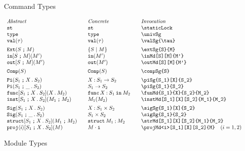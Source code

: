 \documentclass[11pt]{article}
\begin{document}
\begin{figure}
  \caption{Command Types}
  \label{fig:cmd}
\end{figure}

\begin{figure}

  \begin{small}
    \begin{displaymath}
      \begin{array}{l@{\qquad}l@{\qquad}l@{\qquad}l}
        \textit{Abstract} & \textit{Concrete} & \textit{Invocation} \\
        \staticLock                    & \staticLock*         & \verb|\staticLock|                              \\
        \univSg                        & \univSg*             & \verb|\univSg|                                  \\
        \valSg{\tau}                   & \valSg*{\tau}        & \verb|\valSg{\tau}|                             \\[1ex]
        \extSg{S}{M}                   & \extSg*{S}{M}        & \verb|\extSg{S}{M}|                             \\
        \inMd[S][M]{M'}                & \inMd*{M'}           & \verb|\inMd[S][M]{M'}|                          \\
        \outMd[S][M]{M'}               & \outMd*{M'}          & \verb|\outMd[S][M]{M'}|                         \\[1ex]
        \compSg{S}                     & \compSg*{S}          & \verb|\compSg{S}|                               \\[1ex]
        \piSg{S_1}[X]{S_2}             & \piSg*{S_1}[X]{S_2}  & \verb|\piSg{S_1}[X]{S_2}|                       \\
        \piSg{S_1}{S_2}                & \piSg*{S_1}{S_2}     & \verb|\piSg{S_1}{S_2}| \\
        \funMd{S_1}{X}{S_2}{M_2}       & \funMd*{S_1}{X}{S_2}{M_2} & \verb|\funMd{S_1}{X}{S_2}{M_2}|                      \\
        \instMd[S_1][X][S_2]{M_1}{M_2} & \instMd*{M_1}{M_2}   & \verb|\instMd[S_1][X][S_2]{M_1}{M_2}|           \\[1ex]
        \sigSg{S_1}[X]{S_2}            & \sigSg*{S_1}[X]{S_2} & \verb|\sigSg{S_1}[X]{S_2}|                      \\
        \sigSg{S_1}{S_2}               & \sigSg*{S_1}{S_2}    & \verb|\sigSg{S_1}{S_2}| \\
        \strMd[S_1][X][S_2]{M_1}{M_2}  & \strMd*{M_1}{M_2}    & \verb|\strMd[S_1][X][S_2]{M_1}{M_2}|            \\
        \projMd<i>[S_1][X][S_2]{M}     & \projMd*<i>{M}       & \verb|\projMd<i>[S_1][X][S_2]{M}| \quad (i=1,2)
      \end{array}
    \end{displaymath}
  \end{small}

  \caption{Module Types}
  \label{fig:mod}
\end{figure}
\end{document}
